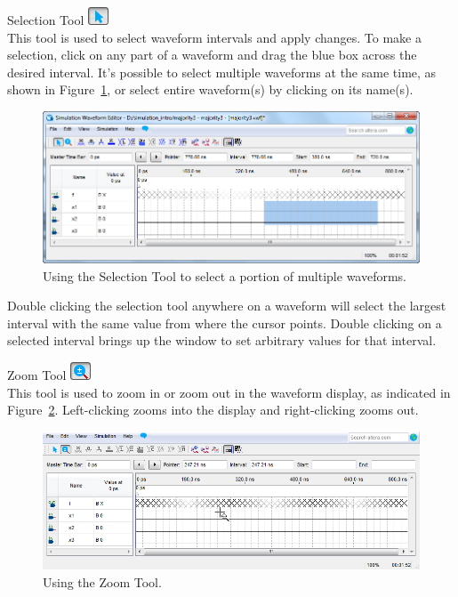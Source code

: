 \documentclass[11pt, twoside, pdftex]{article}
\begin{document}
\begin{description}
	\item {\sf Selection Tool} \hbox{\includegraphics[scale=0.7]{figures/appendix/icon1.png}}\\
	This tool is used to select waveform intervals and apply changes. To make a 
	selection, click on any part of a waveform and drag the blue box across the 
	desired interval. It's possible to select multiple waveforms at the same time, as shown in Figure~\ref{fig:fig1},
	or select entire waveform(s) by clicking on its name(s).\\
	\begin{figure}[H]
	   \begin{center}
	      \includegraphics[scale=0.65]{figures/appendix/figure1.png}
	   \caption{Using the Selection Tool to select a portion of multiple waveforms.} 
		 \label{fig:fig1}
		 \end{center}
	\end{figure}
	
	Double clicking the selection tool anywhere on a waveform will 
	select the largest interval with the same value from where the cursor points. Double clicking on  
	a selected interval brings up the window to set arbitrary values for that interval. 

	\item {\sf Zoom Tool} \hbox{\includegraphics[scale=0.7]{figures/appendix/icon2.png}}\\
	This tool is used to zoom in or zoom out in the waveform display, as indicated in Figure~\ref{fig:fig2}. 
	Left-clicking zooms into the display and right-clicking zooms out.
	\begin{figure}[H]
	   \begin{center}
	      \includegraphics[scale=0.65]{figures/appendix/figure2.png}
	   \caption{Using the Zoom Tool.} 
		 \label{fig:fig2}
		 \end{center}
	\end{figure}
	

\end{description}
\end{document}

